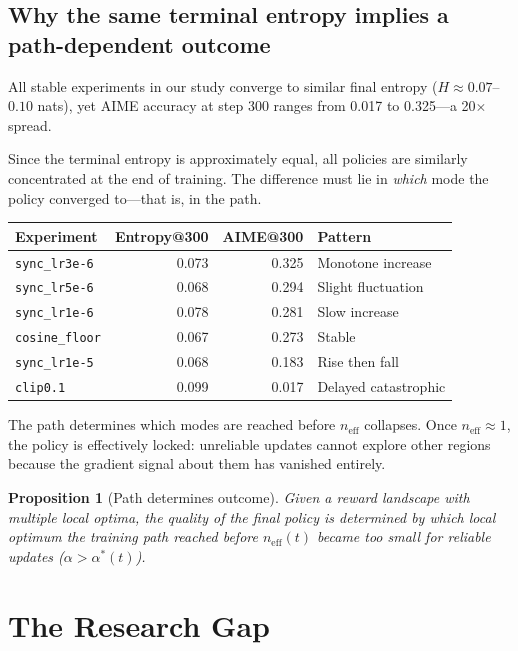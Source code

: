 \documentclass[11pt,a4paper]{article}
\newcommand{\neff}{n_{\mathrm{eff}}}
\newcommand{\alphaopt}{\alpha^*(t)}
\newtheorem{proposition}{Proposition}
\begin{document}
\subsection{Why the same terminal entropy implies a path-dependent outcome}

All stable experiments in our study converge to similar final entropy ($H \approx 0.07$--$0.10$ nats),
yet AIME accuracy at step 300 ranges from 0.017 to 0.325---a 20$\times$ spread.

Since the terminal entropy is approximately equal, all policies are similarly concentrated
at the end of training.
The difference must lie in \emph{which} mode the policy converged to---that is, in the path.

\begin{center}
\begin{tabular}{lrrl}
\toprule
Experiment & Entropy@300 & AIME@300 & Pattern \\
\midrule
\texttt{sync\_lr3e-6}  & 0.073 & 0.325 & Monotone increase \\
\texttt{sync\_lr5e-6}  & 0.068 & 0.294 & Slight fluctuation \\
\texttt{sync\_lr1e-6}  & 0.078 & 0.281 & Slow increase \\
\texttt{cosine\_floor} & 0.067 & 0.273 & Stable \\
\texttt{sync\_lr1e-5}  & 0.068 & 0.183 & Rise then fall \\
\texttt{clip0.1}       & 0.099 & 0.017 & Delayed catastrophic \\
\bottomrule
\end{tabular}
\end{center}

The path determines which modes are reached before $\neff$ collapses.
Once $\neff \approx 1$, the policy is effectively locked: unreliable updates cannot explore
other regions because the gradient signal about them has vanished entirely.

\begin{proposition}[Path determines outcome]
  \label{prop:path}
  Given a reward landscape with multiple local optima, the quality of the final policy
  is determined by which local optimum the training path reached before $\neff(t)$ became
  too small for reliable updates ($\alpha > \alphaopt$).
\end{proposition}

\section{The Research Gap}
\end{document}
